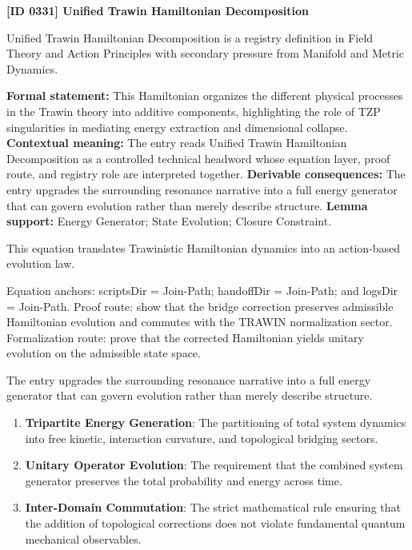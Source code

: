 \clearpage
\noindent\textbf{[ID 0331] Unified Trawin Hamiltonian Decomposition}\par
\vspace{0.35em}
\begingroup\small
{}
Unified Trawin Hamiltonian Decomposition is a registry definition in Field Theory and Action Principles with secondary pressure from Manifold and Metric Dynamics.

\begingroup\footnotesize\setlength{\emergencystretch}{3em}\sloppy
\textbf{Formal statement:} This Hamiltonian organizes the different physical processes in the Trawin theory into additive components, highlighting the role of TZP singularities in mediating energy extraction and dimensional collapse. \textbf{Contextual meaning:} The entry reads Unified Trawin Hamiltonian Decomposition as a controlled technical headword whose equation layer, proof route, and registry role are interpreted together. \textbf{Derivable consequences:} The entry upgrades the surrounding resonance narrative into a full energy generator that can govern evolution rather than merely describe structure. \textbf{Lemma support:} Energy Generator; State Evolution; Closure Constraint.\par
\endgroup

This equation translates Trawinistic Hamiltonian dynamics into an action-based evolution law.

Equation anchors: scriptsDir = Join-Path; handoffDir = Join-Path; and logsDir = Join-Path. Proof route: show that the bridge correction preserves admissible Hamiltonian evolution and commutes with the TRAWIN normalization sector. Formalization route: prove that the corrected Hamiltonian yields unitary evolution on the admissible state space.

The entry upgrades the surrounding resonance narrative into a full energy generator that can govern evolution rather than merely describe structure.
\endgroup

\begin{enumerate}[leftmargin=1.6em,itemsep=6pt,topsep=4pt]
\item \textbf{Tripartite Energy Generation}: The partitioning of total system dynamics into free kinetic, interaction curvature, and topological bridging sectors.
\item \textbf{Unitary Operator Evolution}: The requirement that the combined system generator preserves the total probability and energy across time.
\item \textbf{Inter-Domain Commutation}: The strict mathematical rule ensuring that the addition of topological corrections does not violate fundamental quantum mechanical observables.
\end{enumerate}

